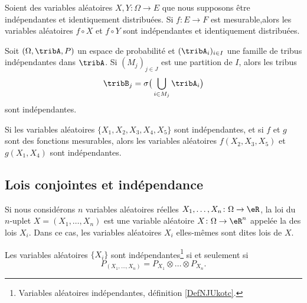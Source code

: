 \begin{lemma}       \label{LEMooWBAZooLVVRjO}
	Soient des variables aléatoires \( X,Y\colon \Omega\to E\) que nous supposons être indépendantes et identiquement distribuées. Si \( f\colon E\to F\) est mesurable,alors les variables aléatoires \( f\circ X\) et \( f\circ Y\) sont indépendantes et identiquement distribuées.
\end{lemma}

\begin{lemma}  \label{LemHOjqqw}
	Soit \( (\Omega,\tribA,P)\) un espace de probabilité et \( (\tribA_i)_{i\in I}\) une famille de tribus indépendantes dans \( \tribA\). Si \( (M_j)_{j\in J}\) est une partition de \( I\), alors les tribus
	\begin{equation}
		\tribB_j=\sigma\big( \bigcup_{i\in M_j}\tribA_i \big)
	\end{equation}
	sont indépendantes.

	Si les variables aléatoires \( \{ X_1,X_2,X_3,X_4,X_5 \}\) sont indépendantes, et si \( f\) et \( g\) sont des fonctions mesurables, alors les variables aléatoires \( f(X_2,X_3,X_5)\) et \( g(X_1,X_4)\) sont indépendantes.
\end{lemma}

\subsection{Lois conjointes et indépendance}

\begin{definition}
	Si nous considérons \( n\) variables aléatoires réelles \( X_1,\ldots,X_n\colon\Omega\to\eR\), la loi du \( n\)-uplet \( X=(X_1,\ldots,X_n)\) est une variable aléatoire \( X\colon \Omega\to \eR^n\) appelée la  des lois \( X_i\). Dans ce cas, les variables aléatoires \( X_i\) elles-mêmes sont dites lois  de \( X\).
\end{definition}

\begin{proposition}     \label{PropPXXXPXPXPX}
	Les variables aléatoires \( \{ X_i \}\) sont indépendantes\footnote{Variables aléatoires indépendantes, définition \ref{DefNJUkotc}.} si et seulement si
	\begin{equation}
		P_{(X_1,\ldots,X_n)}=P_{X_1}\otimes\ldots\otimes P_{X_n}.
	\end{equation}
\end{proposition}

